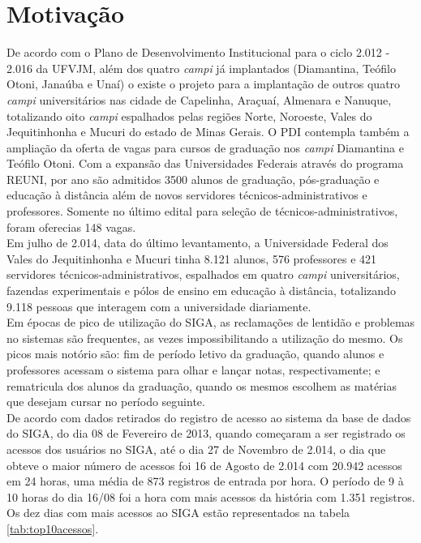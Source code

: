 \section{Motivação}
De acordo com o Plano de Desenvolvimento Institucional para o ciclo 2.012 - 
2.016 da UFVJM, além dos quatro \textit{campi} já implantados (Diamantina, 
Teófilo Otoni, Janaúba e Unaí) o existe o projeto para a implantação de outros 
quatro \textit{campi} universitários nas cidade de Capelinha, Araçuaí, Almenara 
e Nanuque, totalizando oito \textit{campi} espalhados pelas regiões Norte, 
Noroeste, Vales do Jequitinhonha e Mucuri do estado de Minas Gerais. O 
PDI contempla também a ampliação da oferta de vagas para cursos de graduação 
nos \textit{campi} Diamantina e Teófilo Otoni. Com a expansão das Universidades 
Federais através do programa REUNI, por ano são admitidos 3500 alunos de 
graduação, pós-graduação e educação à distância além de novos servidores 
técnicos-administrativos e professores. Somente no último edital para seleção 
de técnicos-administrativos, foram oferecias 148 vagas.\\
Em julho de 2.014, data do último levantamento, a Universidade Federal dos 
Vales do Jequitinhonha e Mucuri tinha 8.121 alunos, 576 professores e 421 
servidores técnicos-administrativos, espalhados em quatro \textit{campi} 
universitários, fazendas experimentais e pólos de ensino em educação à 
distância, totalizando 9.118 pessoas que interagem com a universidade 
diariamente.\\
Em épocas de pico de utilização do SIGA, as reclamações de lentidão e problemas 
no sistemas são frequentes, as vezes impossibilitando a utilização do mesmo. Os 
picos mais notório são: fim de período letivo da graduação, quando alunos e 
professores acessam o sistema para olhar e lançar notas, respectivamente; e 
rematricula dos alunos da graduação, quando os mesmos escolhem as matérias que 
desejam cursar no período seguinte.\\
De acordo com dados retirados do registro de acesso ao sistema da base de dados 
do SIGA, do dia 08 de Fevereiro de 2013, quando começaram a ser registrado os 
acessos dos usuários no SIGA, até o dia 27 de Novembro de 2.014, o dia que 
obteve o maior número de acessos foi 16 de Agosto de 2.014 com 20.942 acessos 
em 24 horas, uma média de 873 registros de entrada por hora. O período de 9 à 
10 horas do dia 16/08 foi a hora com mais acessos da história com 1.351 
registros. Os dez dias com mais acessos ao SIGA estão representados na tabela 
\ref{tab:top10acessos}.

